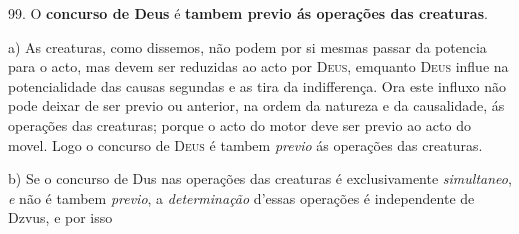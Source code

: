  99. O \textbf{concurso de Deus} é \textbf{tambem previo ás operações das creaturas}.

a) As creaturas, como dissemos, não podem por si mesmas passar da potencia para o acto, mas devem ser reduzidas ao acto por \textsc{Deus}, emquanto \textsc{Deus} influe na potencialidade das causas segundas e as tira da indifferença. Ora este influxo não pode deixar de ser previo ou anterior, na ordem da natureza e da causalidade, ás operações das creaturas; porque o acto do motor deve ser previo ao acto do movel. Logo o concurso de \textsc{Deus} é tambem \emph{previo} ás operações das creaturas.

 b) Se o concurso de Dus nas operações das creaturas é exclusivamente \emph{simultaneo}, \emph{e} não é tambem \emph{previo}, a \emph{determinação} d'essas operações é independente de Dzvus, e por isso

